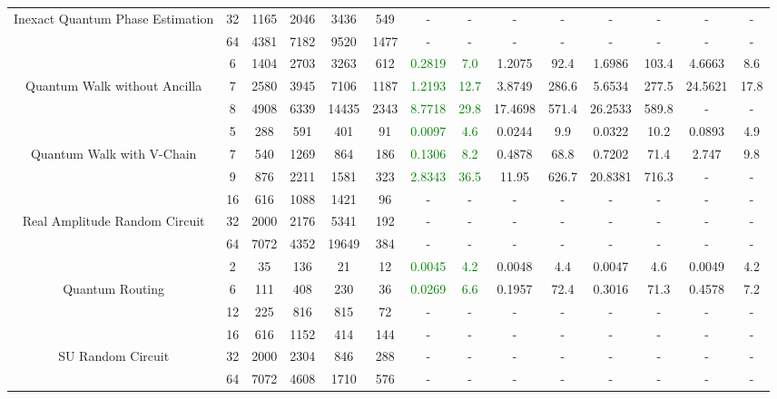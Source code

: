 \begin{table}[htb]
{\begin{tabular}{|c|c|c|c|c|c|c|c|c|c|c|c|c|c|}
Inexact Quantum Phase Estimation & 
32 & 1165 & 2046 & 3436 & 549
 & - & -
 & - & -
 & - & -
 & - & -
 \\
 & 
64 & 4381 & 7182 & 9520 & 1477
 & - & -
 & - & -
 & - & -
 & - & -
 \\
\hline
 & 
6 & 1404 & 2703 & 3263 & 612
 & \textcolor{green}{0.2819} & \textcolor{green}{7.0}
 & 1.2075 & 92.4
 & 1.6986 & 103.4
 & 4.6663 & 8.6
 \\
Quantum Walk without Ancilla & 
7 & 2580 & 3945 & 7106 & 1187
 & \textcolor{green}{1.2193} & \textcolor{green}{12.7}
 & 3.8749 & 286.6
 & 5.6534 & 277.5
 & 24.5621 & 17.8
 \\
 & 
8 & 4908 & 6339 & 14435 & 2343
 & \textcolor{green}{8.7718} & \textcolor{green}{29.8}
 & 17.4698 & 571.4
 & 26.2533 & 589.8
 & - & -
 \\
\hline
 & 
5 & 288 & 591 & 401 & 91
 & \textcolor{green}{0.0097} & \textcolor{green}{4.6}
 & 0.0244 & 9.9
 & 0.0322 & 10.2
 & 0.0893 & 4.9
 \\
Quantum Walk with V-Chain & 
7 & 540 & 1269 & 864 & 186
 & \textcolor{green}{0.1306} & \textcolor{green}{8.2}
 & 0.4878 & 68.8
 & 0.7202 & 71.4
 & 2.747 & 9.8
 \\
 & 
9 & 876 & 2211 & 1581 & 323
 & \textcolor{green}{2.8343} & \textcolor{green}{36.5}
 & 11.95 & 626.7
 & 20.8381 & 716.3
 & - & -
 \\
\hline
 & 
16 & 616 & 1088 & 1421 & 96
 & - & -
 & - & -
 & - & -
 & - & -
 \\
Real Amplitude Random Circuit & 
32 & 2000 & 2176 & 5341 & 192
 & - & -
 & - & -
 & - & -
 & - & -
 \\
 & 
64 & 7072 & 4352 & 19649 & 384
 & - & -
 & - & -
 & - & -
 & - & -
 \\
\hline
 & 
2 & 35 & 136 & 21 & 12
 & \textcolor{green}{0.0045} & \textcolor{green}{4.2}
 & 0.0048 & 4.4
 & 0.0047 & 4.6
 & 0.0049 & 4.2
 \\
Quantum Routing & 
6 & 111 & 408 & 230 & 36
 & \textcolor{green}{0.0269} & \textcolor{green}{6.6}
 & 0.1957 & 72.4
 & 0.3016 & 71.3
 & 0.4578 & 7.2
 \\
 & 
12 & 225 & 816 & 815 & 72
 & - & -
 & - & -
 & - & -
 & - & -
 \\
\hline
 & 
16 & 616 & 1152 & 414 & 144
 & - & -
 & - & -
 & - & -
 & - & -
 \\
SU Random Circuit & 
32 & 2000 & 2304 & 846 & 288
 & - & -
 & - & -
 & - & -
 & - & -
 \\
 & 
64 & 7072 & 4608 & 1710 & 576
 & - & -
 & - & -
 & - & -
 & - & -
 \\

\end{tabular}}
\end{table}
